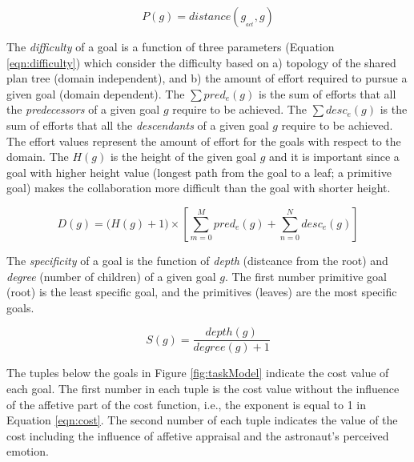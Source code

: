 \documentclass[conference]{IEEEtran}
\begin{document}
\vspace*{-3mm}
\begin{equation}
P(g) =  distance(g_{_{act}},g)
\label{eqn:proximity}
\end{equation}

The \textit{difficulty} of a goal is a function of three parameters (Equation
\ref{eqn:difficulty}) which consider the difficulty based on a) topology of the
shared plan tree (domain independent), and b) the amount of effort required to
pursue a given goal (domain dependent). The $\sum pred_e(g)$ is the sum of
efforts that all the \textit{predecessors} of a given goal $g$ require to be
achieved. The $\sum desc_e(g)$ is the sum of efforts that all the
\textit{descendants} of a given goal $g$ require to be achieved. The effort
values represent the amount of effort for the goals with respect to the domain.
The $H(g)$ is the height of the given goal $g$ and it is important since a goal
with higher height value (longest path from the goal to a leaf; a primitive
goal) makes the collaboration more difficult than the goal with shorter height.

\vspace*{-5mm}
\begin{equation}
D(g) = \Big(H(g)+1\Big)\times\left[\sum\limits_{m=0}^{M} pred_e(g) +
\sum\limits_{n=0}^{N} desc_e(g)\right]
\label{eqn:difficulty}
\end{equation}

The \textit{specificity} of a goal is the function of \textit{depth} (distcance
from the root) and \textit{degree} (number of children) of a given goal $g$. The
first number primitive goal (root) is the least specific goal, and the
primitives (leaves) are the most specific goals.

\vspace*{-2mm}
\begin{equation}
S(g) = \frac{depth(g)}{degree(g)+1}
\label{eqn:specificity}
\end{equation}

The tuples below the goals in Figure \ref{fig:taskModel} indicate the cost value
of each goal. The first number in each tuple is the cost value without the
influence of the affetive part of the cost function, i.e., the exponent is equal
to 1 in Equation \ref{eqn:cost}. The second number of each tuple indicates the
value of the cost including the influence of affetive appraisal and the
astronaut's perceived emotion.
\end{document}
